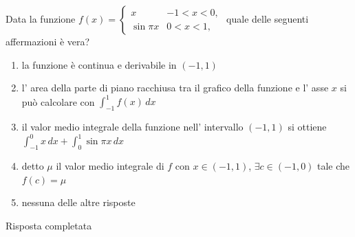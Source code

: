 \begin{quiz}
Data la funzione $\displaystyle f(x)=\begin{cases}x&-1<x<0,\\\sin\pi x&0<x<1,\end{cases}$ quale delle seguenti affermazioni \`e vera?
\begin{enumerate}
\item la funzione \`e continua e derivabile in $(-1,1)$
\item l' area della parte di piano racchiusa tra il grafico della funzione e l' asse $x$ si pu\`o calcolare con $\displaystyle\int_{-1}^1f(x)\,dx$
\item il valor medio integrale della funzione nell' intervallo $(-1,1)$ si ottiene $\displaystyle\int_{-1}^0x\,dx+\int_0^1\sin\pi x\,dx$
\item detto $\mu$ il valor medio integrale di $f$ con $x\in(-1,1)$, $\exists c\in(-1,0)$ tale che $f(c)=\mu$
\item nessuna delle altre risposte
\end{enumerate}
\end{quiz}
Risposta completata
